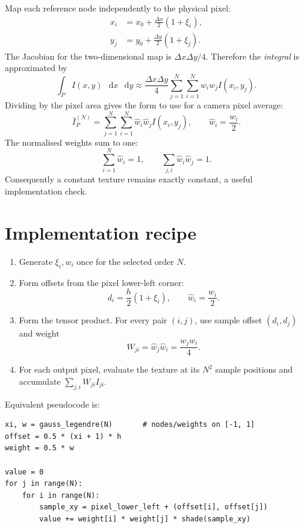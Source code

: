 \documentclass[11pt,a4paper]{article}
\newcommand{\dd}{\mathop{}\!\mathrm{d}}
\begin{document}
Map each reference node independently to the physical pixel:
\begin{align}
    x_i &= x_0+\frac{\Delta x}{2}(1+\xi_i),\\
    y_j &= y_0+\frac{\Delta y}{2}(1+\xi_j).
    \label{eq:node-map}
\end{align}
The Jacobian for the two-dimensional map is
\(\Delta x\Delta y/4\).  Therefore the \emph{integral} is approximated by
\begin{equation}
    \int_P I(x,y)\,\dd x\,\dd y
    \approx
    \frac{\Delta x\Delta y}{4}
    \sum_{j=1}^{N}\sum_{i=1}^{N}
        w_iw_j I(x_i,y_j).
    \label{eq:pixel-integral-rule}
\end{equation}
Dividing by the pixel area gives the form to use for a camera pixel average:
\begin{equation}
    \boxed{
    \bar I_P^{(N)}
    =
    \sum_{j=1}^{N}\sum_{i=1}^{N}
        \widehat w_i\widehat w_j I(x_i,y_j),
    \qquad
    \widehat w_i=\frac{w_i}{2}.
    }
    \label{eq:pixel-average-rule}
\end{equation}
The normalised weights sum to one:
\[
    \sum_{i=1}^{N}\widehat w_i=1,
    \qquad
    \sum_{j,i}\widehat w_i\widehat w_j=1.
\]
Consequently a constant texture remains exactly constant, a useful
implementation check.

\section{Implementation recipe}

\begin{enumerate}
    \item Generate \(\xi_i,w_i\) once for the selected order \(N\).
    \item Form offsets from the pixel lower-left corner:
    \[
        d_i=\frac{h}{2}(1+\xi_i),\qquad
        \widehat w_i=\frac{w_i}{2}.
    \]
    \item Form the tensor product.  For every pair \((i,j)\), use sample
    offset \((d_i,d_j)\) and weight
    \[
        W_{ji}=\widehat w_j\widehat w_i
              =\frac{w_jw_i}{4}.
    \]
    \item For each output pixel, evaluate the texture at its \(N^2\) sample
    positions and accumulate \(\sum_{j,i}W_{ji}I_{ji}\).
\end{enumerate}

Equivalent pseudocode is:
\begin{verbatim}
xi, w = gauss_legendre(N)       # nodes/weights on [-1, 1]
offset = 0.5 * (xi + 1) * h
weight = 0.5 * w

value = 0
for j in range(N):
    for i in range(N):
        sample_xy = pixel_lower_left + (offset[i], offset[j])
        value += weight[i] * weight[j] * shade(sample_xy)
\end{verbatim}
\end{document}
